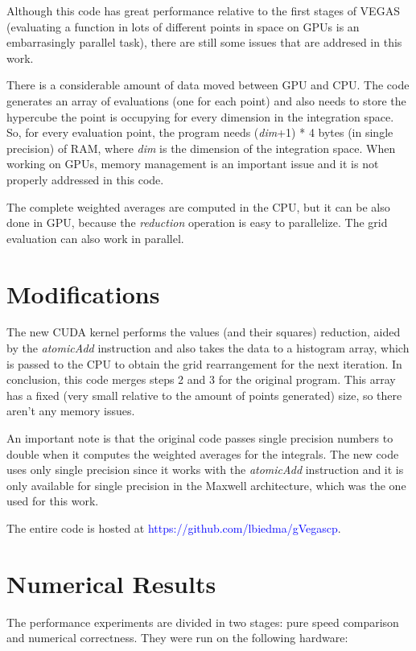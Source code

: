 \documentclass[english]{maciarticle}
\begin{document}
Although this code has great performance relative to the first stages of VEGAS (evaluating a function in lots of different points in space on GPUs is an embarrasingly parallel task), there are still some issues that are addresed in this work.

There is a considerable amount of data moved between GPU and CPU. The code generates an array of evaluations (one for each point) and also needs to store the hypercube the point is occupying for every dimension in the integration space. So, for every evaluation point, the program needs (\textit{dim}+1) * 4 bytes (in single precision) of RAM, where \textit{dim} is the dimension of the integration space. When working on GPUs, memory management is an important issue and it is not properly addressed in this code.

The complete weighted averages are computed in the CPU, but it can be also done in GPU, because the \textit{reduction} operation is easy to parallelize. The grid evaluation can also work in parallel.

\section{Modifications}

The new CUDA kernel performs the values (and their squares) reduction, aided by the \textit{atomicAdd} instruction\cite{cudaprog} and also takes the data to a histogram array, which is passed to the CPU to obtain the grid rearrangement for the next iteration. In conclusion, this code merges steps 2 and 3 for the original program.
This array has a fixed (very small relative to the amount of points generated) size,
so there aren't any memory issues.

An important note is that the original code passes single precision numbers to double when it computes the weighted averages for the integrals. The new code uses only single precision since it works with the \textit{atomicAdd} instruction and it is only available for single precision in the Maxwell architecture, which was the one used for this work.

The entire code is hosted at \textcolor{blue}{https://github.com/lbiedma/gVegascp}.

\section{Numerical Results}

The performance experiments are divided in two stages: pure speed comparison and numerical correctness. They were run on the following hardware:
\end{document}
